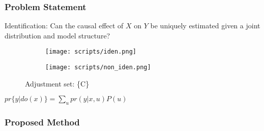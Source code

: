 \documentclass{beamer}
\begin{document}
\begin{frame}
\frametitle{Problem Statement}

\begin{center}
Identification: Can the causal effect of $ X $ on $ Y $ be uniquely estimated given a joint distribution and model structure?
\end{center}

\begin{figure}
    \centering
    \begin{subfigure}[b]{0.5 \textwidth}
	\centering
	\texttt{[image: scripts/iden.png]}
	\label{fig:iden}
    \end{subfigure}%
    \begin{subfigure}[b]{0.5 \textwidth}
	\centering
	\texttt{[image: scripts/non\_iden.png]}
	\label{fig:non_iden}
    \end{subfigure}
    \caption{Adjustment set: \{C\}}
\end{figure}

\begin{center}
	$ pr\{y | do(x)\} = \sum_{u} pr(y | x, u) P(u) $ 
\end{center}
\end{frame}

\begin{frame}
\frametitle{Proposed Method}

\end{frame}
\end{document}
